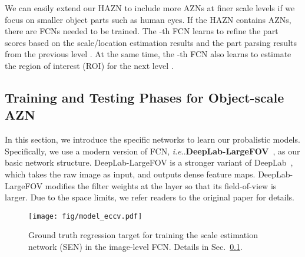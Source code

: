 \documentclass[runningheads]{llncs}
\makeatletter
\DeclareRobustCommand\onedot{\futurelet\@let@token\@onedot}
\def\@onedot{\ifx\@let@token.\else.\null\fi\xspace}
\def\ie{\emph{i.e}\onedot} \def\Ie{\emph{I.e}\onedot}
\makeatother
\begin{document}
We can easily extend our HAZN to include more AZNs at finer scale levels if we focus on smaller object parts such as human eyes.
If the HAZN contains  AZNs, there are  FCNs needed to be trained. The -th FCN learns  to refine the part scores based on the scale/location estimation results  and the part parsing results  from the previous level . At the same time, the -th FCN also learns  to estimate the region of interest (ROI) for the next level .

\vspace{0.6\baselineskip}
\subsection{Training and Testing Phases for Object-scale AZN}
\label{subsec:train_test}
In this section, we introduce the specific networks to learn our probalistic models. Specifically, we use a modern version of FCN, \ie \textbf{DeepLab-LargeFOV}~\cite{chen2014semantic}, as our basic network structure. DeepLab-LargeFOV is a stronger variant of DeepLab~\cite{chen2014semantic}, which takes the raw image as input, and outputs dense feature maps. DeepLab-LargeFOV modifies the filter weights at the  layer so that its field-of-view is larger. Due to the space limits, we refer readers to the original paper for details.

\begin{figure}[!t]
\begin{center}
\texttt{[image: fig/model\_eccv.pdf]}
\end{center}
\vspace{-1\baselineskip}
\caption{Ground truth regression target for training the scale estimation network (SEN) in the image-level FCN. Details in Sec.~\ref{subsec:train_test}.}
\vspace{-1.6\baselineskip}
\label{fig:train_sen}
\end{figure}
\end{document}
